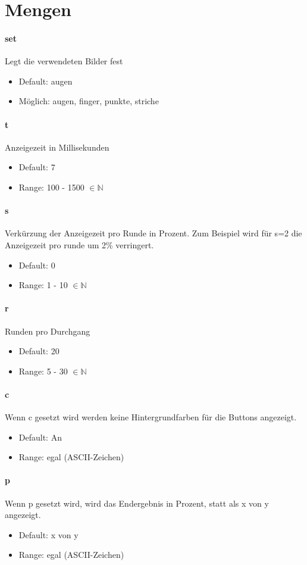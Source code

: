 \documentclass[]{article}
\begin{document}
\section{Mengen}
\begin{multicols}{2}

	\paragraph{set}  Legt die verwendeten Bilder fest
	\begin{itemize}
		\item Default:  augen
		\item Möglich:  augen, finger, punkte, striche
	\end{itemize}

	\paragraph{t} Anzeigezeit in Millisekunden

	\begin{itemize}
		\item Default:  7
		\item Range:  100 - 1500 $\in \mathbb{N}$
	\end{itemize}

	\paragraph{s} Verkürzung der Anzeigezeit pro Runde in Prozent. Zum Beispiel wird für s=2 die Anzeigezeit pro runde um 2\% verringert.
	\begin{itemize}
		\item Default:  0
		\item Range:  1 - 10 $\in \mathbb{N}$
	\end{itemize}

	\paragraph{r}  Runden pro Durchgang
	\begin{itemize}
		\item Default:  20
		\item Range:  5 - 30 $\in \mathbb{N}$
	\end{itemize}

	\paragraph{c}  Wenn c gesetzt wird werden keine Hintergrundfarben für die Buttons angezeigt.
	\begin{itemize}
		\item Default:  An
		\item Range:  egal (ASCII-Zeichen)
	\end{itemize}

	\paragraph{p}  Wenn p gesetzt wird, wird das Endergebnis in Prozent, statt als x von y angezeigt.
	\begin{itemize}
		\item Default:  x von y
		\item Range:  egal (ASCII-Zeichen)
	\end{itemize}

	\end{multicols}
\end{document}
